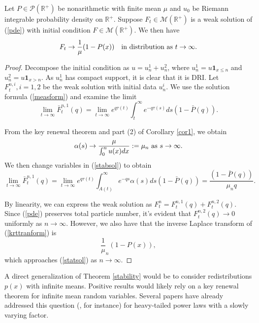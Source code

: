 \begin{theorem}\label{stability}
Let $P \in \mathcal P(\mathbb{R}^+)$ be nonarithmetic with finite mean $\mu$ and $u_0$ be Riemann integrable probability density on $\mathbb{R}^+$.  Suppose $F_t \in \mathcal M(\mathbb{R}^+)$ is a weak solution of (\ref{pde}) with initial condition $F \in \mathcal M(\mathbb{R}^+)$. We then have
 \begin{equation}\label{statsol}
 F_t \rightarrow \frac 1\mu(1-P(x)) \quad \hbox{in distribution as  } t\rightarrow \infty.
 \end{equation} 
\end{theorem} 
\begin{proof}
Decompose the initial condition as $u= u_n^1+u_n^2$, where $u_n^1 = u\mathbf{1}_{x\le n} $ and $u_n^2= u\mathbf{1}_{x> n}$. As $u_n^1$ has compact support, it is clear that it is DRI.  Let $F_t^{n,i}, i= 1,2$ be the weak solution with initial data $u_n^i$.  We use the solution formula (\ref{measform}) and examine the limit
\begin{equation}\label{stabsol}
\lim_{t\rightarrow \infty}\bar F_t^{n,1}(q) = \lim_{t\rightarrow \infty} e^{q\tau(t)}\int_t^\infty e^{-q\tau(s)}ds (1-\bar P(q)).
\end{equation}

From the key renewal theorem and part (2) of Corollary \ref{cor1}, we obtain
\begin{equation}
 \alpha(s) \rightarrow \frac{\mu}{\int_0^n u(x)dx}:=\mu_n \hbox{ as } s \rightarrow \infty.
 \end{equation}  
 We then change variables in (\ref{stabsol}) to obtain
\begin{equation}\label{krttranform}
\lim_{t\rightarrow \infty} \bar F_t^{n,1}(q) = \lim_{t\rightarrow \infty} e^{q \tau(t)}\int_{A(t)}^\infty e^{-qs}\alpha(s)ds (1-\bar P(q)) = \frac{(1-\bar P(q))}{\mu_{n}  q}.
\end{equation}

By linearity, we can express the weak solution as $F_t^{n} = F_t^{n,1}(q)+F_t^{n,2}(q)$. Since (\ref{pde}) preserves total particle number, it's evident that $F_t^{n,2}(q) \rightarrow 0$ uniformly as $n\rightarrow \infty$. However, we also have that the inverse Laplace transform of (\ref{krttranform}) is
\begin{equation}
\frac 1\mu_n(1-P(x)), 
\end{equation}
 which approaches  (\ref{statsol}) as $n\rightarrow \infty.$
\end{proof}

\begin{rem}
A direct generalization of Theorem \ref{stability} would be to consider redistributions $p(x)$ with infinite means.  Positive results would likely rely on a key renewal theorem for infinite mean random variables.  Several papers have already addressed this question (\cite{erickson1970strong,anderson1988strong}, for instance) for heavy-tailed power laws with a slowly varying factor.
\end{rem}






